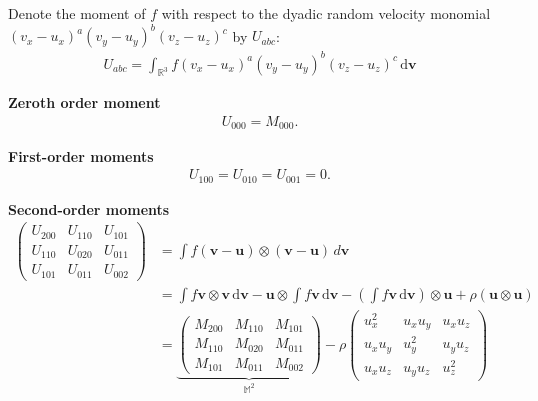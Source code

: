 \documentclass{article}
\begin{document}
Denote the moment of $f$ with respect to the dyadic random velocity monomial $(v_x - u_x)^a (v_y - u_y)^b (v_z - u_z)^c$ by $U_{abc}$:
\begin{align*}
    U_{abc} = \int_{\mathbb{R}^3} f (v_x - u_x)^a (v_y - u_y)^b (v_z - u_z)^c \, \mathrm{d} \bm{v}
\end{align*}

\textbf{Zeroth order moment}
\begin{align*}
    U_{000} = M_{000}.
\end{align*}

\textbf{First-order moments}
\begin{align*}
    U_{100} = U_{010} = U_{001} = 0.
\end{align*}

\textbf{Second-order moments}
\begin{align*}
    \begin{pmatrix}
        U_{200} & U_{110} & U_{101} \\
        U_{110} & U_{020} & U_{011} \\
        U_{101} & U_{011} & U_{002}
    \end{pmatrix}
    &= \int f (\bm{v} - \bm{u}) \otimes (\bm{v} - \bm{u})\,d \bm{v} \\
    &= \int f \bm{v} \otimes \bm{v} \, \mathrm{d} \bm{v} - \bm{u} \otimes \int f \bm{v} \,\mathrm{d} \bm{v} - \left( \int f \bm{v} \, \mathrm{d} \bm{v} \right) \otimes \bm{u} + \rho(\bm{u} \otimes \bm{u}) \\
                                                                 &= \underbrace{\begin{pmatrix}
                                                                     M_{200} & M_{110} & M_{101} \\
                                                                     M_{110} & M_{020} & M_{011} \\
                                                                     M_{101} & M_{011} & M_{002}
                                                             \end{pmatrix}}_{\mathbb{M}^2} - 
                                                                 \rho
                                                                 \begin{pmatrix}
                                                                     u_x^2 & u_x u_y & u_x u_z \\
                                                                     u_x u_y & u_y^2 & u_y u_z \\
                                                                     u_x u_z & u_y u_z & u_z^2
                                                                 \end{pmatrix}
\end{align*}
\end{document}
